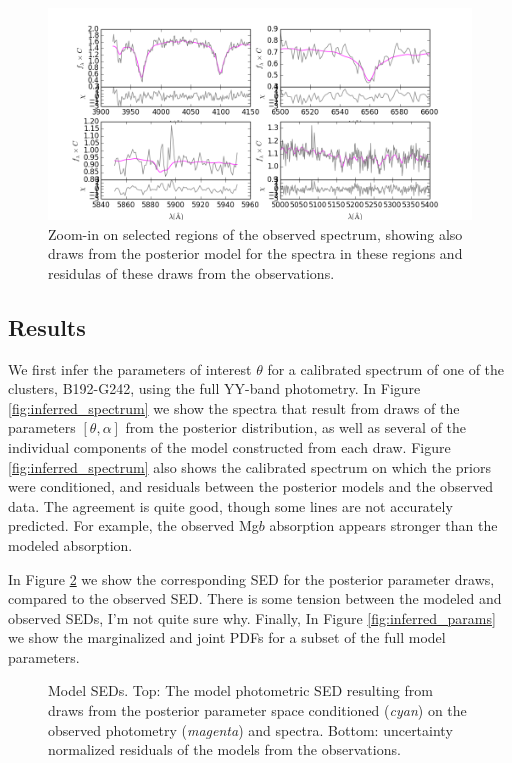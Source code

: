 \documentclass[iop,numberedappendix]{emulateapj}
\newcommand{\excluster}{B192-G242}
\begin{document}
\begin{figure}[h!]
\includegraphics[width=\textwidth]{figures/zfig_b192-g242_225_cal.png}
\caption{Zoom-in on selected regions of the observed spectrum, showing
also draws from the posterior model for the spectra in these regions
and residulas of these draws from the observations.
\label{fig:zoom_spectrum}}
\end{figure}

\subsection{Results}

We first infer the parameters of interest $\theta$ for a calibrated
spectrum of one of the clusters, \excluster, using the full YY-band
photometry. In Figure \ref{fig:inferred_spectrum} we show the spectra
that result from draws of the parameters $[\theta,\alpha]$ from the
posterior distribution, as well as several of the individual
components of the model constructed from each draw. Figure
\ref{fig:inferred_spectrum} also shows the calibrated spectrum on
which the priors were conditioned, and residuals between the posterior
models and the observed data.  The agreement is quite good, though
some lines are not accurately predicted.  For example, the observed
Mg$b$ absorption appears stronger than the modeled
absorption.

In Figure \ref{fig:inferred_sed} we show the corresponding SED for the
posterior parameter draws, compared to the observed SED. There is some
tension between the modeled and observed SEDs, I'm not quite sure
why. Finally, In Figure \ref{fig:inferred_params} we show the
marginalized and joint PDFs for a subset of the full model parameters.


\begin{figure}[h!]
\caption{ Model SEDs.  Top: The model photometric SED resulting from
draws from the posterior parameter space conditioned ({\it cyan}) on
the observed photometry ({\it magenta}) and spectra.  Bottom:
uncertainty normalized residuals of the models from the observations.
\label{fig:inferred_sed}}
\end{figure}
\end{document}
